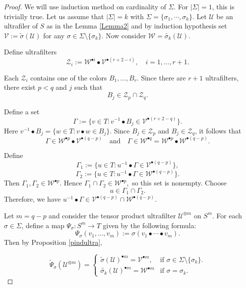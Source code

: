\documentclass[12pt]{amsart}
\begin{document}
\begin{proof}
We will use induction method on cardinality of $\Sigma.$ For $|\Sigma|=1$, this is trivially true. Let us assume that $|\Sigma|=k$ with $\Sigma= \{\sigma_1, \cdots, \sigma_k\}$. 
Let $\mathcal{U}$ be an ultrafiler of $S$ as in the Lemma \ref{Lemma2} and by induction hypothesis set $\mathcal{V} := \widetilde{\sigma}(\mathcal{U})$ for any $\sigma \in \Sigma \setminus  \{\sigma_k\}$. Now consider $\mathcal{W }= \widetilde{\sigma_k}(\mathcal{U}).$

Define ultrafilters
\[
\mathcal{Z}_{i} := \mathcal{W}^{\bullet i} \bullet \mathcal{V}^{\bullet (r+2-i)}, \quad i=1,\dots,r+1.
\]

Each $\mathcal{Z}_i$ contains one of the colors $B_1,\dots,B_r$. Since there are $r+1$ ultrafilters, there exist $p<q$ and $j$ such that
\[
B_j \in \mathcal{Z}_p \cap \mathcal{Z}_q.
\]

Define a set
\[
\Gamma := \{ v \in T : v^{-1} \bullet B_j \in \mathcal{V}^{\bullet (r+2-q)} \} 
.\]
Here $v^{-1} \bullet B_j= \{w \in T : v\bullet w \in B_j\}.$
Since $B_j \in \mathcal{Z}_p$ and $B_j \in \mathcal{Z}_q$, it follows that
\[
\Gamma \in \mathcal{W}^{\bullet p} \bullet \mathcal{V}^{\bullet (q-p)} \quad \text{and} \quad
\Gamma \in \mathcal{W}^{\bullet q} = \mathcal{W}^{\bullet p} \bullet \mathcal{W}^{\bullet (q-p)}.
\]

Define
\[
\Gamma_1 := \{ u \in T : u^{-1} \bullet \Gamma \in \mathcal{V}^{\bullet (q-p)} \},
\]
\[
\Gamma_2 := \{ u \in T : u^{-1}\bullet \Gamma \in \mathcal{W}^{\bullet (q-p)} \}.
\]
Then $\Gamma_1, \Gamma_2 \in \mathcal{W}^{\bullet p}$.
Hence $\Gamma_1\cap\Gamma_2\in\mathcal{W}^{\bullet p},$ so this set is nonempty. Choose
\[
u\in \Gamma_1\cap\Gamma_2.
\]
Therefore, we have $u^{-1} \bullet \Gamma \in \mathcal{V}^{\bullet (q-p)} \cap \mathcal{W}^{\bullet (q-p)}.$

Let $m = q-p$ and consider the tensor product ultrafilter $\mathcal{U}^{\otimes m}$ on $S^m$. For each $\sigma \in \Sigma$, define a map $\Psi_\sigma : S^m \to T$ given by the following formula:
\[
\Psi_\sigma(v_1,\dots,v_m) := \sigma(v_1 \bullet \cdots \bullet v_m).
\]
Then by Proposition \ref{pindultra},

\[
\widetilde{\Psi}_\sigma(\mathcal{U}^{\otimes m})
=
\begin{cases}
\widetilde{\sigma}(\mathcal{U})^{\bullet m}
=\mathcal{V}^{\bullet m},
& \text{if } \sigma\in \Sigma\setminus\{\sigma_k\}.\\ \widetilde{\sigma_k}(\mathcal{U})^{\bullet m} = \mathcal{W}^{\bullet m} & \text{if } \sigma=\sigma_k.
\end{cases}
\]


\end{proof}
\end{document}
